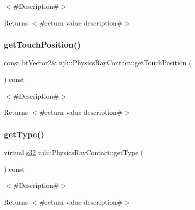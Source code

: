$<$\#\+Description\#$>$

\begin{DoxyReturn}{Returns}
$<$\#return value description\#$>$ 
\end{DoxyReturn}
\mbox{\label{classnjli_1_1_physics_ray_contact_aead7a5c4b596bb008533c4d75ec06054}} 
\subsubsection{\texorpdfstring{get\+Touch\+Position()}{getTouchPosition()}}
{\footnotesize\ttfamily const bt\+Vector2\& njli\+::\+Physics\+Ray\+Contact\+::get\+Touch\+Position (\begin{DoxyParamCaption}{ }\end{DoxyParamCaption}) const}

$<$\#\+Description\#$>$

\begin{DoxyReturn}{Returns}
$<$\#return value description\#$>$ 
\end{DoxyReturn}
\mbox{\label{classnjli_1_1_physics_ray_contact_a0bb5770242ff196aa9c3102fc4baa731}} 
\subsubsection{\texorpdfstring{get\+Type()}{getType()}}
{\footnotesize\ttfamily virtual \mbox{\hyperlink{_util_8h_aa62c75d314a0d1f37f79c4b73b2292e2}{s32}} njli\+::\+Physics\+Ray\+Contact\+::get\+Type (\begin{DoxyParamCaption}{ }\end{DoxyParamCaption}) const\hspace{0.3cm}{\ttfamily [virtual]}}

$<$\#\+Description\#$>$

\begin{DoxyReturn}{Returns}
$<$\#return value description\#$>$ 
\end{DoxyReturn}


